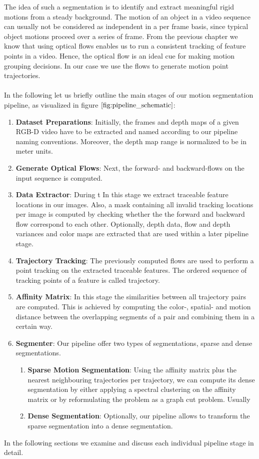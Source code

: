 The idea of such a segmentation is to identify and extract meaningful rigid motions from a steady background. The motion of an object in a video sequence can usually not be considered as independent in a per frame basis, since typical object motions proceed over a series of frame. From the previous chapter we know that using optical flows enables us to run a consistent tracking of feature points in a video. Hence, the optical flow is an ideal cue for making motion grouping decisions. In our case we use the flows to generate motion point trajectories.\\ \\
In the following let us briefly outline the main stages of our motion segmentation pipeline, as visualized in figure $\ref{fig:pipeline_schematic}$:
\begin{enumerate}
\item \textbf{Dataset Preparations}: Initially, the frames and depth maps of a given RGB-D video have to be extracted and named according to our pipeline naming conventions. Moreover, the depth map range is normalized to be in meter units.
\item \textbf{Generate Optical Flows}: Next, the forward- and backward-flows on the input sequence is computed.
\item \textbf{Data Extractor}: During t
In this stage we extract traceable feature locations in our images. Also, a mask containing all invalid tracking locations per image is computed by checking whether the the forward and backward flow correspond to each other. Optionally, depth data, flow and depth variances and color maps are extracted that are used within a later pipeline stage. 
\item \textbf{Trajectory Tracking}: The previously computed flows are used to perform a point tracking on the extracted traceable features. The ordered sequence of tracking points of a feature is called trajectory. 
\item \textbf{Affinity Matrix}: In this stage the similarities between all trajectory pairs are computed. This is achieved by computing the color-, spatial- and motion distance between the overlapping segments of a pair and combining them in a certain way.
\item \textbf{Segmenter}: Our pipeline offer two types of segmentations, sparse and dense segmentations. 
	\begin{enumerate}
	\item \textbf{Sparse Motion Segmentation}: Using the affinity matrix plus the nearest neighbouring trajectories per trajectory, we can compute its dense segmentation by either applying a spectral clustering on the affinity matrix or by reformulating the problem as a graph cut problem. Usually
	\item \textbf{Dense Segmentation}: Optionally, our pipeline allows to transform the sparse segmentation into a dense segmentation. 	
	\end{enumerate}
\end{enumerate}
In the following sections we examine and discuss each individual pipeline stage in detail. 

